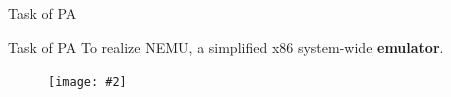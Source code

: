 \documentclass{beamer}
\newcommand{\fignocaption}[2]{
	\begin{figure}[htp]
		\centering
		\texttt{[image: \#2]}
	\end{figure}
}
\begin{document}
\begin{frame}{Task of PA}
	\begin{block}{Task of PA}
		To realize \alert{NEMU}, a  simplified x86 system-wide \textbf{emulator}.
	\end{block}
%	
%	
%	
\fignocaption{scale=0.3}{emulator.png}
\end{frame}
\end{document}
